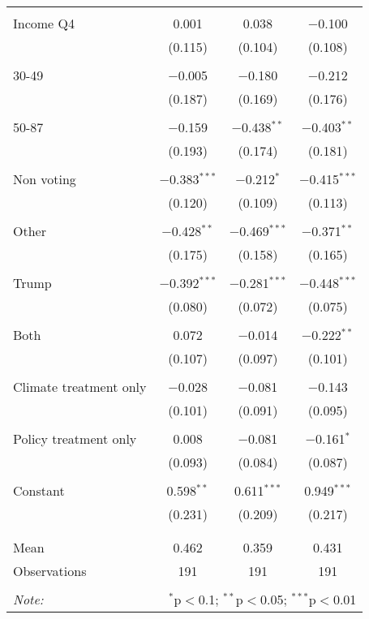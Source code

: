 \begin{tabular}{@{\extracolsep{5pt}}lccc}
  & & & \\ 
 Income Q4 & 0.001 & 0.038 & $-$0.100 \\ 
  & (0.115) & (0.104) & (0.108) \\ 
  & & & \\ 
 30-49 & $-$0.005 & $-$0.180 & $-$0.212 \\ 
  & (0.187) & (0.169) & (0.176) \\ 
  & & & \\ 
 50-87 & $-$0.159 & $-$0.438$^{**}$ & $-$0.403$^{**}$ \\ 
  & (0.193) & (0.174) & (0.181) \\ 
  & & & \\ 
 Non voting & $-$0.383$^{***}$ & $-$0.212$^{*}$ & $-$0.415$^{***}$ \\ 
  & (0.120) & (0.109) & (0.113) \\ 
  & & & \\ 
 Other & $-$0.428$^{**}$ & $-$0.469$^{***}$ & $-$0.371$^{**}$ \\ 
  & (0.175) & (0.158) & (0.165) \\ 
  & & & \\ 
 Trump & $-$0.392$^{***}$ & $-$0.281$^{***}$ & $-$0.448$^{***}$ \\ 
  & (0.080) & (0.072) & (0.075) \\ 
  & & & \\ 
 Both & 0.072 & $-$0.014 & $-$0.222$^{**}$ \\ 
  & (0.107) & (0.097) & (0.101) \\ 
  & & & \\ 
 Climate treatment only & $-$0.028 & $-$0.081 & $-$0.143 \\ 
  & (0.101) & (0.091) & (0.095) \\ 
  & & & \\ 
 Policy treatment only & 0.008 & $-$0.081 & $-$0.161$^{*}$ \\ 
  & (0.093) & (0.084) & (0.087) \\ 
  & & & \\ 
 Constant & 0.598$^{**}$ & 0.611$^{***}$ & 0.949$^{***}$ \\ 
  & (0.231) & (0.209) & (0.217) \\ 
  & & & \\ 
\hline \\[-1.8ex] 
Mean & 0.462 & 0.359 & 0.431 \\ 
Observations & 191 & 191 & 191 \\ 
\hline 
\hline \\[-1.8ex] 
\textit{Note:}  & \multicolumn{3}{r}{$^{*}$p$<$0.1; $^{**}$p$<$0.05; $^{***}$p$<$0.01} \\ 
\end{tabular} 
